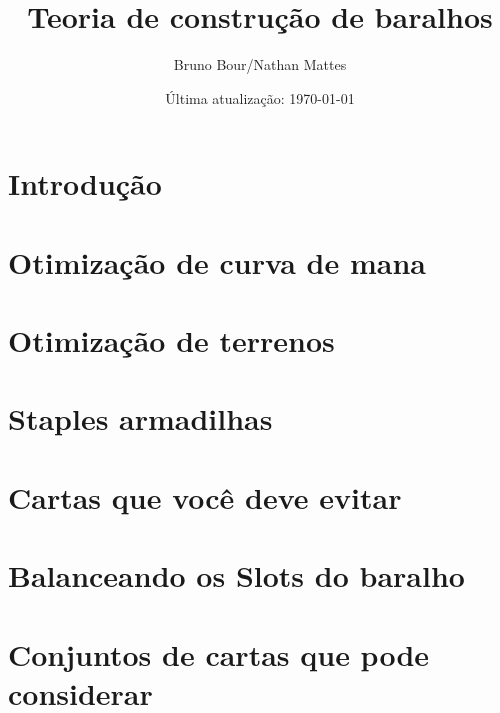 \documentclass[12pt, a4paper]{article}
\newcommand{\card}[1]{\href{https://gatherer.wizards.com/Pages/Card/Details.aspx?name=#1}{\textit{#1}}}
\begin{document}
\bgroup\obeylines

\title{Teoria de construção de baralhos}
\author{Bruno Bour/Nathan Mattes}
\date{Última atualização: \today}
    \maketitle

    \tableofcontents
    

    \pagebreak


    
    \section{Introdução}
     \pagebreak

    \section{Otimização de curva de mana}
     \pagebreak
    
    \section{Otimização de terrenos}
     \pagebreak

    \section{Staples armadilhas}
     \pagebreak

    \section{Cartas que você deve evitar}
     \pagebreak

    \section{Balanceando os Slots do baralho}
     \pagebreak

    \section{Conjuntos de cartas que pode considerar}
     \pagebreak
\end{document}
